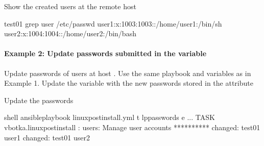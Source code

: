 \documentclass[letterpaper,10pt,english]{sphinxmanual}
\begin{document}
Show the created users at the remote host

%
\begin{sphinxVerbatim}[commandchars=\\\{\}]
test\PYGZus{}01\PYGZgt{} grep user /etc/passwd
user1:x:1003:1003::/home/user1:/bin/sh
user2:x:1004:1004::/home/user2:/bin/bash
\end{sphinxVerbatim}
\sphinxresetverbatimhllines


\paragraph{Example 2: Update passwords submitted in the variable}
\label{\detokenize{task-passwords-passwordstore-ex2:example-2-update-passwords-submitted-in-the-variable}}\label{\detokenize{task-passwords-passwordstore-ex2::doc}}
Update passwords of users at host . Use the same playbook and
variables as in Example 1. Update the variable  with the new
passwords stored in the attribute 

%
\begin{sphinxVerbatim}[commandchars=\\\{\}]
       
       
\end{sphinxVerbatim}
\sphinxresetverbatimhllines

Update the passwords

%
\begin{sphinxVerbatim}[commandchars=\\\{\}]
shell\PYGZgt{} ansible\PYGZhy{}playbook linux\PYGZhy{}postinstall.yml \PYGZhy{}t lp\PYGZus{}passwords 
                                    \PYGZhy{}e 
...
TASK \PYG{o}{[}vbotka.linux\PYGZus{}postinstall : users: Manage user accounts\PYG{o}{]} **********
changed: \PYG{o}{[}test\PYGZus{}01\PYG{o}{]} \PYGZgt{} user1
changed: \PYG{o}{[}test\PYGZus{}01\PYG{o}{]} \PYGZgt{} user2
\end{sphinxVerbatim}
\sphinxresetverbatimhllines
\end{document}
